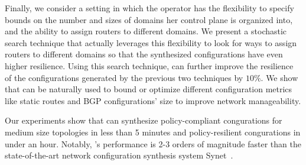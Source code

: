 Finally, we consider a setting in which the operator has the
flexibility to specify bounds on the number and sizes of domains her
control plane is organized into, and the ability to assign routers to
different domains.  We present a stochastic search technique that
actually leverages this flexibility to look for ways to assign routers
to different domains so that the synthesized configurations have even
higher resilience.  Using this search technique, \name can further
improve the resilience of the configurations generated by the previous
two techniques by $10\%$. We show that \name can be naturally used to
bound or optimize different configuration metrics like static routes
and BGP configurations' size to improve network manageability. 

Our experiments show that 
\name can synthesize policy-compliant 
congurations for medium size topologies 
in less than 5 minutes and 
policy-resilient congurations in under an hour. 
Notably, \name's performance is 2-3
orders of magnitude faster than the state-of-the-art network
configuration synthesis system Synet~\cite{synet}. 







